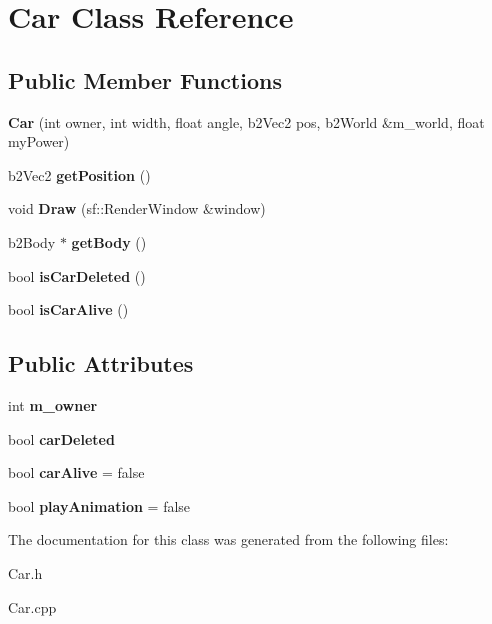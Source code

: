 \hypertarget{class_car}{}\section{Car Class Reference}
\label{class_car}
\subsection*{Public Member Functions}
\begin{DoxyCompactItemize}
\item 
{\bfseries Car} (int owner, int width, float angle, b2\+Vec2 pos, b2\+World \&m\+\_\+world, float my\+Power)\hypertarget{class_car_aff0b105063118e6b01d33f8fbbe19d26}{}\label{class_car_aff0b105063118e6b01d33f8fbbe19d26}

\item 
b2\+Vec2 {\bfseries get\+Position} ()\hypertarget{class_car_a509df1f0213b94e38096e18a840240e9}{}\label{class_car_a509df1f0213b94e38096e18a840240e9}

\item 
void {\bfseries Draw} (sf\+::\+Render\+Window \&window)\hypertarget{class_car_a780cabbfbb5bdc48666a5e427141f9ce}{}\label{class_car_a780cabbfbb5bdc48666a5e427141f9ce}

\item 
b2\+Body $\ast$ {\bfseries get\+Body} ()\hypertarget{class_car_a4c77c25e49e0dd4e45973116185f5898}{}\label{class_car_a4c77c25e49e0dd4e45973116185f5898}

\item 
bool {\bfseries is\+Car\+Deleted} ()\hypertarget{class_car_ae86e025a2119090ed7136476b4e7fde5}{}\label{class_car_ae86e025a2119090ed7136476b4e7fde5}

\item 
bool {\bfseries is\+Car\+Alive} ()\hypertarget{class_car_a508c3eb79d9d646a964ee0ac801b8c41}{}\label{class_car_a508c3eb79d9d646a964ee0ac801b8c41}

\end{DoxyCompactItemize}
\subsection*{Public Attributes}
\begin{DoxyCompactItemize}
\item 
int {\bfseries m\+\_\+owner}\hypertarget{class_car_a7285e52da24b520b9a1cead928f51d81}{}\label{class_car_a7285e52da24b520b9a1cead928f51d81}

\item 
bool {\bfseries car\+Deleted}\hypertarget{class_car_a941524b9c2553c3477dd8a56bc5bce16}{}\label{class_car_a941524b9c2553c3477dd8a56bc5bce16}

\item 
bool {\bfseries car\+Alive} = false\hypertarget{class_car_ad925fbe28f64ccf4f2bae8ad0c34fa62}{}\label{class_car_ad925fbe28f64ccf4f2bae8ad0c34fa62}

\item 
bool {\bfseries play\+Animation} = false\hypertarget{class_car_a543e225ad548c30d0f92f1d81910c7fe}{}\label{class_car_a543e225ad548c30d0f92f1d81910c7fe}

\end{DoxyCompactItemize}


The documentation for this class was generated from the following files\+:\begin{DoxyCompactItemize}
\item 
Car.\+h\item 
Car.\+cpp\end{DoxyCompactItemize}
